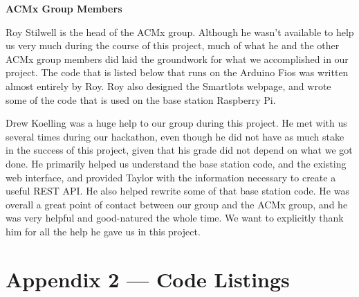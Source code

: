 \documentclass[11pt, oneside, fullpage, doublespace]{article}
\begin{document}
\textbf{ACMx Group Members}

Roy Stilwell is the head of the ACMx group. Although he wasn't available to help us very much during the course of this project, much of what he and the other ACMx group members did laid the groundwork for what we accomplished in our project. The code that is listed below that runs on the Arduino Fios was written almost entirely by Roy. Roy also designed the Smartlots webpage, and wrote some of the code that is used on the base station Raspberry Pi.

Drew Koelling was a huge help to our group during this project. He met with us several times during our hackathon, even though he did not have as much stake in the success of this project, given that his grade did not depend on what we got done. He primarily helped us understand the base station code, and the existing web interface, and provided Taylor with the information necessary to create a useful REST API. He also helped rewrite some of that base station code. He was overall a great point of contact between our group and the ACMx group, and he was very helpful and good-natured the whole time. We want to explicitly thank him for all the help he gave us in this project.

\section*{Appendix 2 --- Code Listings}
\end{document}
